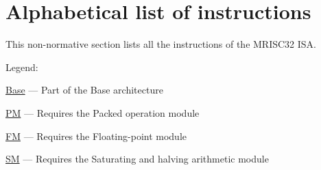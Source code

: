 %

\chapter{Alphabetical list of instructions}

This non-normative section lists all the instructions of the MRISC32 ISA.

Legend:
\begin{bulletitems}
  \item{\hyperref[module:Base]{Base} --- Part of the Base architecture}
  \item{\hyperref[module:PM]{PM} --- Requires the Packed operation module}
  \item{\hyperref[module:FM]{FM} --- Requires the Floating-point module}
  \item{\hyperref[module:SM]{SM} --- Requires the Saturating and halving arithmetic module}
\end{bulletitems}


